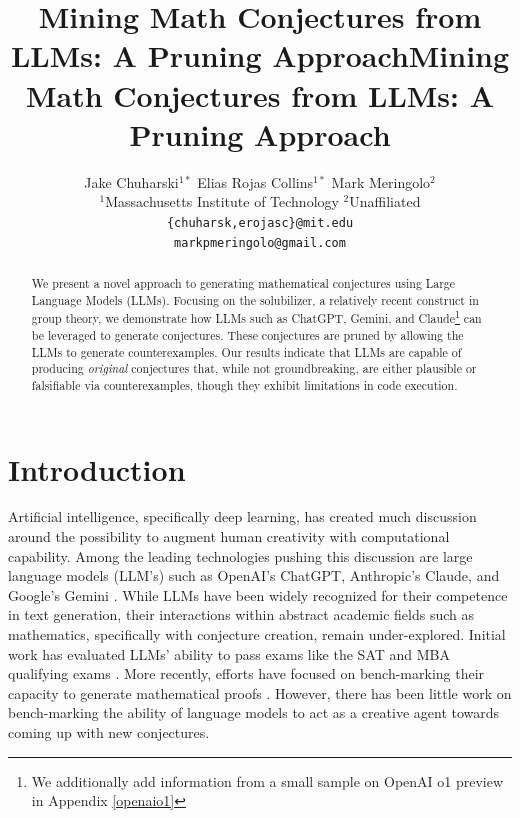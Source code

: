 \documentclass{article}
\title{Mining Math Conjectures from LLMs: A Pruning Approach}
\title{Mining Math Conjectures from LLMs: A Pruning Approach}
\author{
Jake Chuharski\(^{1*}\) \quad Elias Rojas Collins\(^{1*}\) \quad Mark Meringolo\(^2\) \\
\(^1\)Massachusetts Institute of Technology \quad \(^2\)Unaffiliated\\
\texttt{\{chuharsk,erojasc\}@mit.edu}\\
\texttt{markpmeringolo@gmail.com}
}
\begin{document}
\maketitle
\begingroup
\renewcommand{\thefootnote}{\fnsymbol{footnote}}%
%
\endgroup



\begin{abstract} We present a novel approach to generating mathematical conjectures using Large Language Models (LLMs). Focusing on the solubilizer, a relatively recent construct in group theory, we demonstrate how LLMs such as ChatGPT, Gemini, and Claude\footnote{We additionally add information from a small sample on OpenAI o1 preview in Appendix \ref{openaio1}} can be leveraged to generate conjectures. These conjectures are pruned by allowing the LLMs to generate counterexamples. Our results indicate that LLMs are capable of producing \textit{original} conjectures that, while not groundbreaking, are either plausible or falsifiable via counterexamples, though they exhibit limitations in code execution. \end{abstract}

\section{Introduction} Artificial intelligence, specifically deep learning, has created much discussion around the possibility to augment human creativity with computational capability. Among the leading technologies pushing this discussion are large language models (LLM's) such as OpenAI's ChatGPT, Anthropic's Claude, and Google's Gemini \cite{openaigpt4, anthropic2023claude, geminiteam2024geminifamilyhighlycapable}. While LLMs have been widely recognized for their competence in text generation, their interactions within abstract academic fields such as mathematics, specifically with conjecture creation, remain under-explored. Initial work has evaluated LLMs' ability to pass exams like the SAT and MBA qualifying exams \cite{MBA, openaigpt4}. More recently, efforts have focused on bench-marking their capacity to generate mathematical proofs \cite{romera2024mathematical}. However, there has been little work on bench-marking the ability of language models to act as a creative agent towards coming up with new conjectures.
\end{document}
